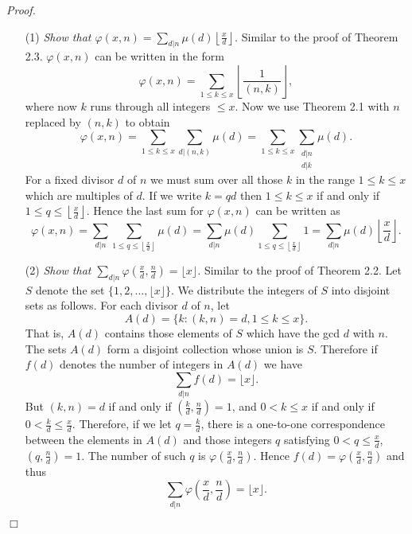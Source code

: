 \documentclass{article}
\begin{document}
\emph{Proof.}
\begin{enumerate}
\item[(1)]
  \emph{Show that $\varphi(x,n) = \sum_{d|n} \mu(d) \left\lfloor \frac{x}{d} \right\rfloor$.}
  Similar to the proof of Theorem 2.3.
  $\varphi(x,n)$ can be written in the form
  \[
    \varphi(x,n) = \sum_{1 \leq k \leq x}\left\lfloor \frac{1}{(n,k)} \right\rfloor,
  \]
  where now $k$ runs through all integers $\leq x$.
  Now we use Theorem 2.1 with $n$ replaced by $(n,k)$ to obtain
  \[
    \varphi(x,n)
    = \sum_{1 \leq k \leq x} \sum_{d|(n,k)} \mu(d)
    = \sum_{1 \leq k \leq x} \sum_{\substack{d|n \\ d|k}} \mu(d).
  \]
  For a fixed divisor $d$ of $n$ we must sum over all those $k$ in the range $1 \leq k \leq x$
  which are multiples of $d$.
  If we write $k = qd$ then $1 \leq k \leq x$ if and only if
  $1 \leq q \leq \left\lfloor \frac{x}{d} \right\rfloor$.
  Hence the last sum for $\varphi(x,n)$ can be written as
  \[
    \varphi(x,n)
    = \sum_{d|n} \sum_{1 \leq q \leq \left\lfloor \frac{x}{d} \right\rfloor} \mu(d)
    = \sum_{d|n} \mu(d) \sum_{1 \leq q \leq \left\lfloor \frac{x}{d} \right\rfloor} 1
    = \sum_{d|n} \mu(d) \left\lfloor \frac{x}{d} \right\rfloor.
  \]

\item[(2)]
  \emph{Show that $\sum_{d|n} \varphi\left( \frac{x}{d},\frac{n}{d} \right) = \lfloor x \rfloor$.}
  Similar to the proof of Theorem 2.2.
  Let $S$ denote the set $\{ 1, 2, \ldots, \lfloor x \rfloor \}$.
  We distribute the integers of $S$ into disjoint sets as follows.
  For each divisor $d$ of $n$, let
  \[
    A(d) = \{ k : (k,n) = d, 1 \leq k \leq x \}.
  \]
  That is, $A(d)$ contains those elements of $S$ which have the gcd $d$ with $n$.
  The sets $A(d)$ form a disjoint collection whose union is $S$.
  Therefore if $f(d)$ denotes the number of integers in $A(d)$ we have
  \[
    \sum_{d|n} f(d) = \lfloor x \rfloor.
  \]
  But $(k,n) = d$ if and only if $\left( \frac{k}{d}, \frac{n}{d} \right) = 1$,
  and $0 < k \leq x$ if and only if $0 < \frac{k}{d} \leq \frac{x}{d}$.
  Therefore, if we let $q = \frac{k}{d}$,
  there is a one-to-one correspondence between the elements in $A(d)$
  and those integers $q$ satisfying
  $0 < q \leq \frac{x}{d}$, $\left( q, \frac{n}{d} \right) = 1$.
  The number of such $q$ is $\varphi\left( \frac{x}{d},\frac{n}{d} \right)$.
  Hence $f(d) = \varphi\left( \frac{x}{d},\frac{n}{d} \right)$ and thus
  \[
    \sum_{d|n} \varphi\left( \frac{x}{d},\frac{n}{d} \right) = \lfloor x \rfloor.
  \]
\end{enumerate}
$\Box$ \\\\
\end{document}
